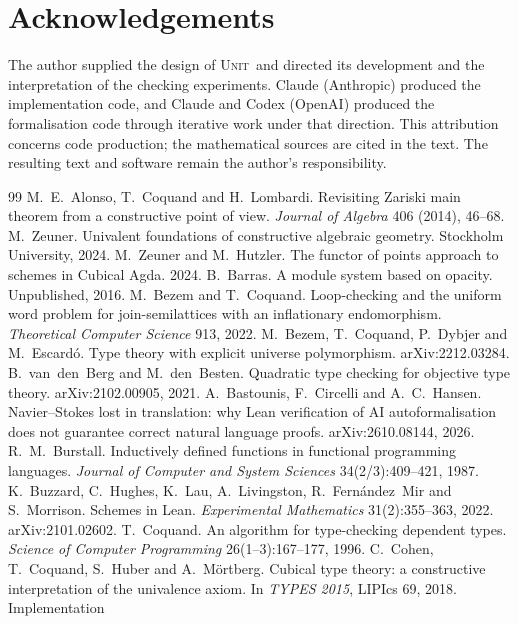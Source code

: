 \documentclass[11pt]{article}
\newcommand{\sys}{\textsc{Unit}}
\begin{document}
\section*{Acknowledgements}

The author supplied the design of \sys\ and directed its development
and the interpretation of the checking experiments. Claude (Anthropic)
produced the implementation code, and Claude and Codex (OpenAI)
produced the formalisation code through iterative work under that
direction. This attribution concerns code production; the mathematical
sources are cited in the text. The resulting text and software remain
the author's responsibility.

\begin{thebibliography}{99}
 M.~E.~Alonso, T.~Coquand and H.~Lombardi. Revisiting
  Zariski main theorem from a constructive point of view. \emph{Journal
  of Algebra} 406 (2014), 46--68.
 M.~Zeuner. Univalent foundations of constructive
  algebraic geometry. Stockholm University, 2024.
 M.~Zeuner and M.~Hutzler. The functor of points approach
  to schemes in Cubical Agda. 2024.
 B.~Barras. A module system based on opacity.
  Unpublished, 2016.
 M.~Bezem and T.~Coquand. Loop-checking and the uniform word
  problem for join-semilattices with an inflationary endomorphism.
  \emph{Theoretical Computer Science} 913, 2022.
 M.~Bezem, T.~Coquand, P.~Dybjer and M.~Escard\'o. Type
  theory with explicit universe polymorphism. arXiv:2212.03284.
 B.~van~den~Berg and M.~den~Besten. Quadratic type checking
  for objective type theory. arXiv:2102.00905, 2021.
 A.~Bastounis, F.~Circelli and A.~C.~Hansen. Navier--Stokes
  lost in translation: why Lean verification of AI autoformalisation does
  not guarantee correct natural language proofs. arXiv:2610.08144, 2026.
 R.~M.~Burstall. Inductively defined functions in functional
  programming languages. \emph{Journal of Computer and System Sciences}
  34(2/3):409--421, 1987.
 K.~Buzzard, C.~Hughes, K.~Lau, A.~Livingston,
  R.~Fern\'andez~Mir and S.~Morrison. Schemes in Lean.
  \emph{Experimental Mathematics} 31(2):355--363, 2022.
  arXiv:2101.02602.
 T.~Coquand. An algorithm for type-checking dependent types.
  \emph{Science of Computer Programming} 26(1--3):167--177, 1996.
 C.~Cohen, T.~Coquand, S.~Huber and A.~M\"ortberg.
  Cubical type theory: a constructive interpretation of the univalence
  axiom. In \emph{TYPES 2015}, LIPIcs 69, 2018. Implementation

\end{thebibliography}
\end{document}
